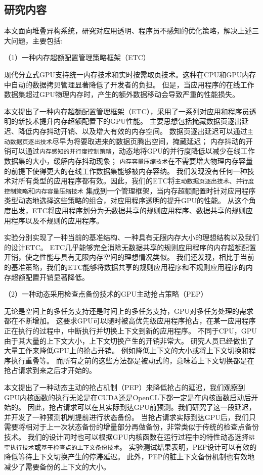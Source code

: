 \subsection{研究内容}
本文面向堆叠异构系统，研究对应用透明、程序员不感知的优化策略，解决上述三大问题，主要包括:

（1）一种内存超额配置管理策略框架（ETC）

现代分立式GPU支持统一内存技术和实时按需取页技术。这种在CPU和GPU内存中自动的数据拷贝管理显著降低了开发者的负担。
但是，当应用程序的在线工作数据集超过GPU物理内存时，产生的额外数据移动会导致严重的性能损失。

本文提出了一种内存超额配置管理框架（ETC），采用了一系列对应用和程序员透明的新技术提升内存超额配置下的GPU性能。
主要思想包括掩藏数据页逐出延迟、降低内存抖动开销、以及增大有效的内存空间。
数据页逐出延迟可以通过\texttt{主动数据页逐出技术}尽早为将要取进来的数据页腾出空间，掩藏延迟；
内存抖动的开销可以通过\texttt{内存感知的并行度控制策略}，动态地将GPU的并行度降低以减少在线工作数据集的大小，缓解内存抖动现象；
\texttt{内存容量压缩技术}在不需要增大物理内存容量的前提下使得更大的在线工作数据集能够被内存容纳。
我们发现没有任何一种技术对所有类型的应用程序都有效。因此，我们的ETC将\texttt{主动数据页逐出技术}、\texttt{并行度控制策略}和\texttt{内存容量压缩技术}
集成到一个管理框架，当内存超额配置时针对应用程序类型动态地选择这些策略的组合，对应用程序透明的提升GPU的性能。
从这个角度出发，ETC将应用程序划分为无数据共享的规则应用程序、数据共享的规则应用程序以及不规则的应用程序。

实验分别实现了一种当前的基准结构、一种具有无限内存大小的理想结构以及我们的设计ETC。
ETC几乎能够完全消除无数据共享的规则应用程序的内存超额配置开销，使之性能与具有无限内存空间的理想情况类似。
我们还发现，相比于当前的基准策略，我们的ETC能够将数据共享的规则应用程序和不规则应用程序的内存超额配置开销显著降低。

（2）一种动态采用检查点备份技术的GPU主动抢占策略（PEP）

无论是空间上的多任务支持还是时间上的多任务支持，GPU对多任务处理的需求都在不断增加。
这要求GPU可以随时被高优先级应用程序抢占，在某一应用程序正在执行的过程中，中断执行并切换上下文到新的应用程序。
不同于CPU，GPU由于其大量的上下文大小，上下文切换产生的开销非常大。
研究人员已经做出了大量工作来降低GPU上的抢占开销。
例如降低上下文的大小或将上下文切换和程序执行重叠等。
而所有之前的这些方法都是被动式的，意味着上下文切换都是在抢占请求到来之后才开始的。

本文提出了一种动态主动的抢占机制（PEP）来降低抢占的延迟，我们观察到GPU内核函数的执行无论是在CUDA还是OpenCL下都一定是在内核函数启动后开始的。
因此，抢占请求可以在其实际到达GPU前预测。我们研究了这一段延迟，并开发了一种预测机制提前进行状态备份。
当抢占请求实际到达GPU后，我们只需要将相对于上一次状态备份的增量部分再做备份，非常类似于传统的检查点备份技术。
我们的设计同时也可以根据GPU内核函数在运行过程中的特性动态选择\texttt{排空执行技术}或\texttt{基于检查点的上下文备份技术}。
实验测试结果表明，PEP设计可以有效的降低等待上下文切换产生的停滞延迟。
此外，PEP的脏上下文备份机制也有效地减少了需要备份的上下文的大小。

